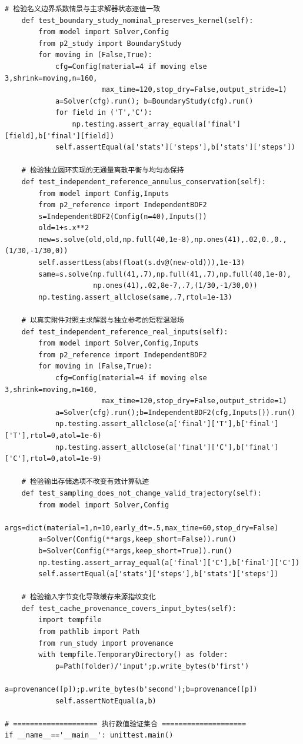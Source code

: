 \begin{Verbatim}[fontsize=\scriptsize,breaklines=true,breakanywhere=true]
    # 检验名义边界系数情景与主求解器状态逐值一致
    def test_boundary_study_nominal_preserves_kernel(self):
        from model import Solver,Config
        from p2_study import BoundaryStudy
        for moving in (False,True):
            cfg=Config(material=4 if moving else 3,shrink=moving,n=160,
                       max_time=120,stop_dry=False,output_stride=1)
            a=Solver(cfg).run(); b=BoundaryStudy(cfg).run()
            for field in ('T','C'):
                np.testing.assert_array_equal(a['final'][field],b['final'][field])
            self.assertEqual(a['stats']['steps'],b['stats']['steps'])

    # 检验独立圆环实现的无通量离散平衡与均匀态保持
    def test_independent_reference_annulus_conservation(self):
        from model import Config,Inputs
        from p2_reference import IndependentBDF2
        s=IndependentBDF2(Config(n=40),Inputs())
        old=1+s.x**2
        new=s.solve(old,old,np.full(40,1e-8),np.ones(41),.02,0.,0.,(1/30,-1/30,0))
        self.assertLess(abs(float(s.dv@(new-old))),1e-13)
        same=s.solve(np.full(41,.7),np.full(41,.7),np.full(40,1e-8),
                     np.ones(41),.02,8e-7,.7,(1/30,-1/30,0))
        np.testing.assert_allclose(same,.7,rtol=1e-13)

    # 以真实附件对照主求解器与独立参考的短程温湿场
    def test_independent_reference_real_inputs(self):
        from model import Solver,Config,Inputs
        from p2_reference import IndependentBDF2
        for moving in (False,True):
            cfg=Config(material=4 if moving else 3,shrink=moving,n=160,
                       max_time=120,stop_dry=False,output_stride=1)
            a=Solver(cfg).run();b=IndependentBDF2(cfg,Inputs()).run()
            np.testing.assert_allclose(a['final']['T'],b['final']['T'],rtol=0,atol=1e-6)
            np.testing.assert_allclose(a['final']['C'],b['final']['C'],rtol=0,atol=1e-9)

    # 检验输出存储选项不改变有效计算轨迹
    def test_sampling_does_not_change_valid_trajectory(self):
        from model import Solver,Config
        args=dict(material=1,n=10,early_dt=.5,max_time=60,stop_dry=False)
        a=Solver(Config(**args,keep_short=False)).run()
        b=Solver(Config(**args,keep_short=True)).run()
        np.testing.assert_array_equal(a['final']['C'],b['final']['C'])
        self.assertEqual(a['stats']['steps'],b['stats']['steps'])

    # 检验输入字节变化导致缓存来源指纹变化
    def test_cache_provenance_covers_input_bytes(self):
        import tempfile
        from pathlib import Path
        from run_study import provenance
        with tempfile.TemporaryDirectory() as folder:
            p=Path(folder)/'input';p.write_bytes(b'first')
            a=provenance([p]);p.write_bytes(b'second');b=provenance([p])
            self.assertNotEqual(a,b)

# ==================== 执行数值验证集合 ====================
if __name__=='__main__': unittest.main()
\end{Verbatim}
